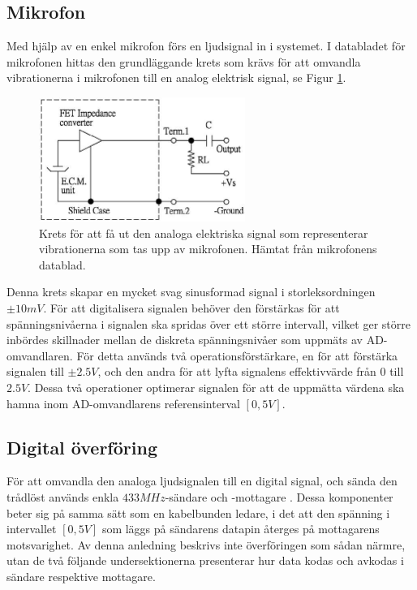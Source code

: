 \documentclass[a4paper,10pt]{article}
\begin{document}
\subsection{Mikrofon}

Med hjälp av en enkel mikrofon förs en ljudsignal in i systemet. 
I databladet för mikrofonen \cite{mic} hittas den grundläggande krets som krävs 
för att omvandla vibrationerna i mikrofonen till en analog elektrisk signal, se 
Figur \ref{fig:mikrofon}.

\begin{figure}[h]
    \centering
    \includegraphics[width=0.6\textwidth]{mik.jpg}
    \caption{Krets för att få ut den analoga elektriska signal som representerar
	     vibrationerna som tas upp av mikrofonen. Hämtat från mikrofonens
	     datablad.}
    \label{fig:mikrofon}
\end{figure}

Denna krets skapar en mycket svag sinusformad signal i storleksordningen 
$\pm 10 mV$. För att digitalisera signalen behöver den förstärkas för att 
spänningsnivåerna i signalen ska spridas över ett större intervall, vilket ger 
större inbördes skillnader mellan de diskreta spänningsnivåer som uppmäts av 
AD-omvandlaren. För detta används två operationsförstärkare, en för att 
förstärka signalen till $\pm 2.5 V$, och den andra för att lyfta signalens 
effektivvärde från $0$ till $2.5 V$. Dessa två operationer optimerar signalen
för att de uppmätta värdena ska hamna inom AD-omvandlarens referensinterval
$[0,5V]$.

\subsection{Digital överföring}

För att omvandla den analoga ljudsignalen till en digital signal, och sända den 
trådlöst används enkla $433 MHz$-sändare och -mottagare \cite{radio}. Dessa 
komponenter beter sig på samma sätt som en kabelbunden ledare, i det att den 
spänning i intervallet $[0, 5V]$ som läggs på sändarens datapin återges på 
mottagarens motsvarighet. Av denna anledning beskrivs inte överföringen som 
sådan närmre, utan de två följande undersektionerna presenterar hur data kodas 
och avkodas i sändare respektive mottagare.
\end{document}
